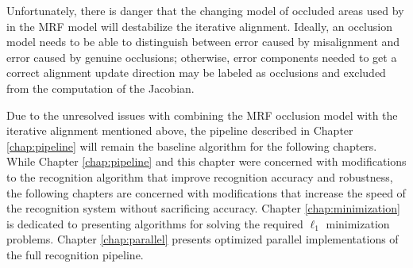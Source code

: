 Unfortunately, there is danger that the changing model of occluded areas
used by in the MRF model will destabilize the iterative alignment.  Ideally, an
occlusion model needs to be able to distinguish between error caused by
misalignment and error caused by genuine occlusions; otherwise, error
components needed to get a correct alignment update direction may be labeled as
occlusions and excluded from the computation of the Jacobian.

Due to the unresolved issues with combining the MRF occlusion model with the
iterative alignment mentioned above, the pipeline described in Chapter
\ref{chap:pipeline} will remain the baseline algorithm for the following
chapters.  While Chapter \ref{chap:pipeline} and this chapter were concerned
with modifications to the recognition algorithm that improve recognition
accuracy and robustness, the following chapters are concerned with
modifications that increase the speed of the recognition system without
sacrificing accuracy.  Chapter \ref{chap:minimization} is dedicated to
presenting algorithms for solving the required $\ell_1$ minimization problems.
Chapter \ref{chap:parallel} presents optimized parallel implementations of the
full recognition pipeline.


